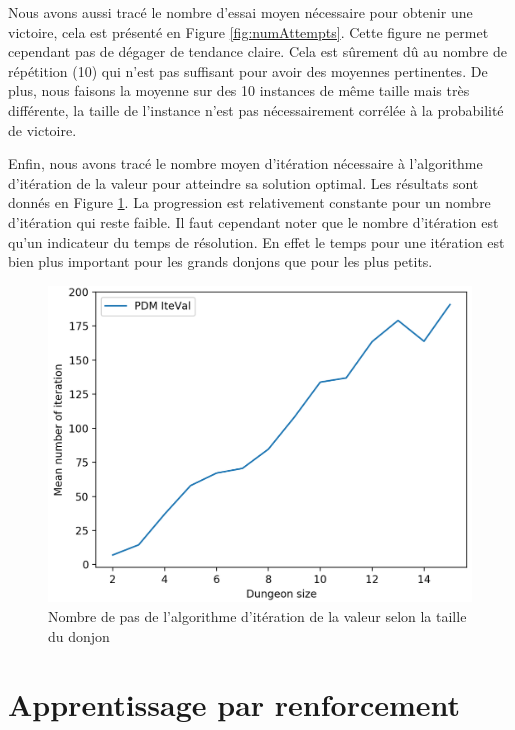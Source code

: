 \documentclass[a4paper]{article}
\theoremstyle{plain}
\begin{document}
Nous avons aussi tracé le nombre d'essai moyen nécessaire pour obtenir une victoire, cela est présenté en Figure \ref{fig:numAttempts}. Cette figure ne permet cependant pas de dégager de tendance claire. Cela est sûrement dû au nombre de répétition (10) qui n'est pas suffisant pour avoir des moyennes pertinentes. De plus, nous faisons la moyenne sur des 10 instances de même taille mais très différente, la taille de l'instance n'est pas nécessairement corrélée à la probabilité de victoire.


Enfin, nous avons tracé le nombre moyen d'itération nécessaire à l'algorithme d'itération de la valeur pour atteindre sa solution optimal. Les résultats sont donnés en Figure \ref{fig:numIte}. La progression est relativement constante pour un nombre d'itération qui reste faible. Il faut cependant noter que le nombre d'itération est qu'un indicateur du temps de résolution. En effet le temps pour une itération est bien plus important pour les grands donjons que pour les plus petits.

\begin{figure}
	\centering
	\includegraphics[scale=0.7]{PlotNumIte.png}
	\caption{Nombre de pas de l'algorithme d'itération de la valeur selon la taille du donjon}
	\label{fig:numIte}
\end{figure}

\section{Apprentissage par renforcement}
\end{document}

